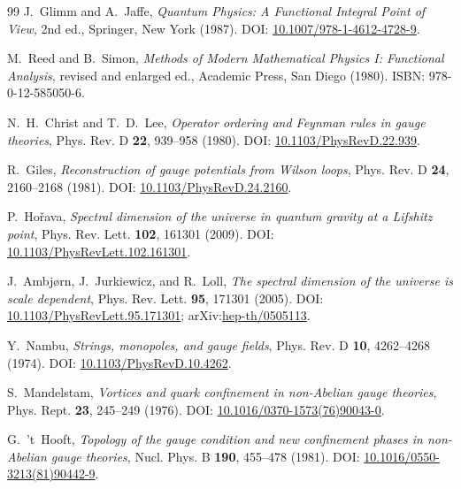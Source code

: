 \documentclass[11pt,a4paper]{amsart}
\theoremstyle{definition}
\begin{document}
\begin{thebibliography}{99}
J.~Glimm and A.~Jaffe, \emph{Quantum Physics: A Functional Integral Point of View}, 2nd ed., Springer, New York (1987). DOI: \href{https://doi.org/10.1007/978-1-4612-4728-9}{10.1007/978-1-4612-4728-9}.

M.~Reed and B.~Simon, \emph{Methods of Modern Mathematical Physics I: Functional Analysis}, revised and enlarged ed., Academic Press, San Diego (1980). ISBN: 978-0-12-585050-6.

N.~H.~Christ and T.~D.~Lee, \emph{Operator ordering and Feynman rules in gauge theories}, Phys. Rev. D \textbf{22}, 939--958 (1980). DOI: \href{https://doi.org/10.1103/PhysRevD.22.939}{10.1103/PhysRevD.22.939}.

R.~Giles, \emph{Reconstruction of gauge potentials from Wilson loops}, Phys. Rev. D \textbf{24}, 2160--2168 (1981). DOI: \href{https://doi.org/10.1103/PhysRevD.24.2160}{10.1103/PhysRevD.24.2160}.

P.~Ho\v{r}ava, \emph{Spectral dimension of the universe in quantum gravity at a Lifshitz point}, Phys. Rev. Lett. \textbf{102}, 161301 (2009). DOI: \href{https://doi.org/10.1103/PhysRevLett.102.161301}{10.1103/PhysRevLett.102.161301}.

J.~Ambj{\o}rn, J.~Jurkiewicz, and R.~Loll, \emph{The spectral dimension of the universe is scale dependent}, Phys. Rev. Lett. \textbf{95}, 171301 (2005). DOI: \href{https://doi.org/10.1103/PhysRevLett.95.171301}{10.1103/PhysRevLett.95.171301}; arXiv:\href{https://arxiv.org/abs/hep-th/0505113}{hep-th/0505113}.

Y.~Nambu, \emph{Strings, monopoles, and gauge fields}, Phys. Rev. D \textbf{10}, 4262--4268 (1974). DOI: \href{https://doi.org/10.1103/PhysRevD.10.4262}{10.1103/PhysRevD.10.4262}.

S.~Mandelstam, \emph{Vortices and quark confinement in non-Abelian gauge theories}, Phys. Rept. \textbf{23}, 245--249 (1976). DOI: \href{https://doi.org/10.1016/0370-1573(76)90043-0}{10.1016/0370-1573(76)90043-0}.

G.~'t~Hooft, \emph{Topology of the gauge condition and new confinement phases in non-Abelian gauge theories}, Nucl. Phys. B \textbf{190}, 455--478 (1981). DOI: \href{https://doi.org/10.1016/0550-3213(81)90442-9}{10.1016/0550-3213(81)90442-9}.


\end{thebibliography}
\end{document}
